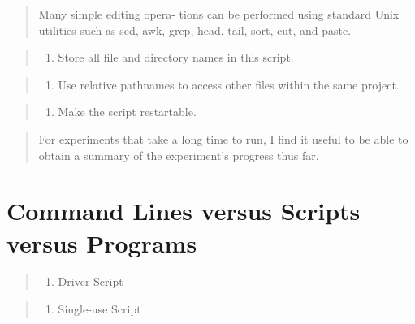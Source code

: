 \documentclass[12pt,]{book}
\providecommand{\tightlist}{%
  \setlength{\itemsep}{0pt}\setlength{\parskip}{0pt}}
\begin{document}
\begin{quote}
Many simple editing opera- tions can be performed using standard Unix
utilities such as sed, awk, grep, head, tail, sort, cut, and paste.
\end{quote}

\begin{quote}
\begin{enumerate}
\def\labelenumi{\arabic{enumi}.}
\setcounter{enumi}{3}
\tightlist
\item
  Store all file and directory names in this script.
\end{enumerate}
\end{quote}

\begin{quote}
\begin{enumerate}
\def\labelenumi{\arabic{enumi}.}
\setcounter{enumi}{4}
\tightlist
\item
  Use relative pathnames to access other files within the same project.
\end{enumerate}
\end{quote}

\begin{quote}
\begin{enumerate}
\def\labelenumi{\arabic{enumi}.}
\setcounter{enumi}{5}
\tightlist
\item
  Make the script restartable.
\end{enumerate}
\end{quote}

\begin{quote}
For experiments that take a long time to run, I find it useful to be
able to obtain a summary of the experiment's progress thus far.
\end{quote}

\section{Command Lines versus Scripts versus
Programs}\label{command-lines-versus-scripts-versus-programs}

\begin{quote}
\begin{enumerate}
\def\labelenumi{\arabic{enumi}.}
\tightlist
\item
  Driver Script
\end{enumerate}
\end{quote}

\begin{quote}
\begin{enumerate}
\def\labelenumi{\arabic{enumi}.}
\setcounter{enumi}{1}
\tightlist
\item
  Single-use Script
\end{enumerate}
\end{quote}
\end{document}
